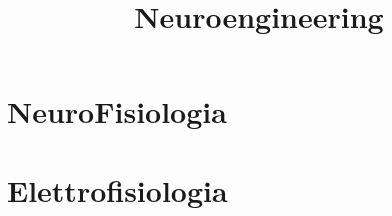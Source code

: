 \documentclass[12pt,a4paper,openany]{book}  %
\theoremstyle{definition}
\begin{document}
\title{\textbf{Neuroengineering}}
\author{}
\maketitle
\tableofcontents

\part{NeuroFisiologia}



\part{Elettrofisiologia}


\end{document}
